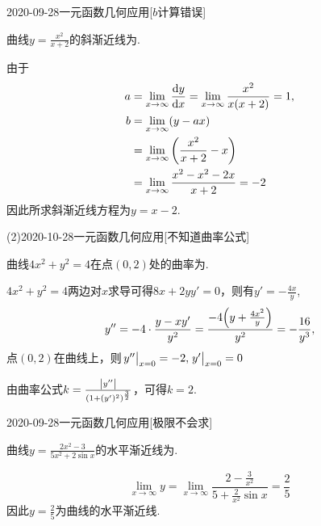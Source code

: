 \documentclass{ctexart}
\begin{document}
\begin{mathques}{2020-09-28}{一元函数几何应用}[$b$计算错误]
\begin{ques}
曲线$y = \frac{x^2}{x + 2}$的斜渐近线为\mathblank.
\end{ques}
\begin{solu}

  由于
  \begin{align*}
    a &= \lim_{x \to \infty} \dv{y}{x} = \lim_{x \to \infty} \frac{x^2}{x(x + 2)} =
    1, \\
    b &= \lim_{x \to \infty} (y - ax) \\
    &= \lim_{x \to \infty} \qty(\frac{x^2}{x + 2} - x) \\
    &= \lim_{x \to \infty} \frac{x^2 - x^2 - 2x}{x + 2} = -2
  \end{align*}
  因此所求斜渐近线方程为$y = x - 2.$
\end{solu}
\end{mathques}

\begin{mathques}(2){2020-10-28}{一元函数几何应用}[不知道曲率公式]
\begin{ques}
  曲线$4x^2 + y^2 = 4$在点$(0, 2)$处的曲率为\mathblank.
\end{ques}
\begin{solu}

  $4x^2 + y^2 = 4$两边对$x$求导可得$8x + 2yy' = 0$，则有$y' = -\frac{4x}{y}$,
  \[
    y'' = -4\cdot \frac{y - xy'}{y^2} = \frac{-4\qty(y + \frac{4x^2}{y})}{y^2}
    = -\frac{16}{y^3},
  \]
  点$(0, 2)$在曲线上，则$\eval{y''}_{x = 0} = -2, \eval{y'}_{x = 0} = 0$

  由曲率公式$k = \frac{\abs{y''}}{\qty(1 + (y')^2)^{\frac{3}{2}}}$，可得$k =
  2.$
\end{solu}
\end{mathques}

\begin{mathques}{2020-09-28}{一元函数几何应用}[极限不会求]
\begin{ques}
曲线$y = \frac{2x^2 - 3}{5x^2 + 2\sin x}$的水平渐近线为\mathblank.
\end{ques}
\begin{solu}

  \[
  \lim_{x \to \infty} y = \lim_{x \to \infty} \frac{2 - \frac{3}{x^2}}{5 +
  \frac{2}{x^2} \sin x} = \frac{2}{5}
  \]
  因此$y = \frac{2}{5}$为曲线的水平渐近线.
\end{solu}
\end{mathques}
\end{document}
